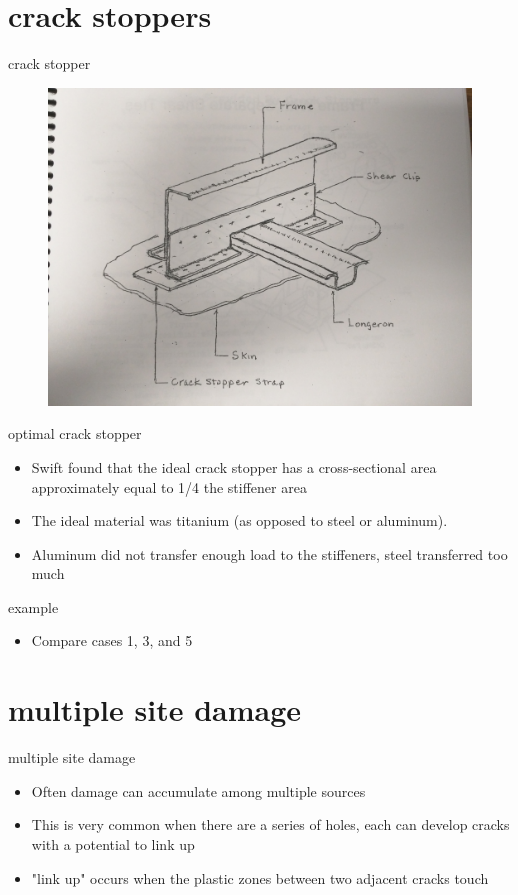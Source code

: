\documentclass[10pt]{beamer}
\begin{document}
\section{crack stoppers}

\begin{frame}{crack stopper}
\begin{figure}
\centering
\includegraphics[width=0.7\linewidth]{crack_stoppers}
\label{fig:crack_stoppers}
\end{figure}
\end{frame}

\begin{frame}{optimal crack stopper}
	\begin{itemize}[<+->]
		\item Swift found that the ideal crack stopper has a cross-sectional area approximately equal to 1/4 the stiffener area
		\item The ideal material was titanium (as opposed to steel or aluminum).
		\item Aluminum did not transfer enough load to the stiffeners, steel transferred too much
	\end{itemize}
\end{frame}

\begin{frame}{example}
	\begin{itemize}
		\item Compare cases 1, 3, and 5 
	\end{itemize}
\end{frame}

\section{multiple site damage}

\begin{frame}{multiple site damage}
	\begin{itemize}[<+->]
		\item Often damage can accumulate among multiple sources
		\item This is very common when there are a series of holes, each can develop cracks with a potential to link up
		\item "link up" occurs when the plastic zones between two adjacent cracks touch
	\end{itemize}
\end{frame}
\end{document}
